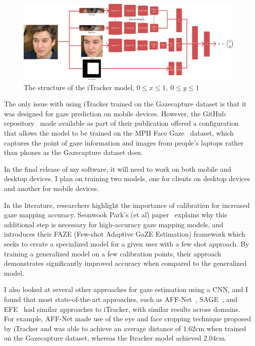 \documentclass{report}
\begin{document}
\begin{figure}[h]
    \begin{center}
        \includegraphics[scale=0.07]{../assets/itracker-model-my-own.png}
    \end{center}
    \caption{The structure of the iTracker model, \(0\leq x \leq 1,~0 \leq y \leq 1\)}
    \label{fig:itracker-model}
\end{figure}

The only issue with using iTracker trained on the Gazecapture dataset is that it was designed for gaze prediction on mobile devices. However, the GitHub repository~\cite{krafka2016eye,cheng2021survey} made available as part of their publication offered a configuration that allows the model to be trained on the MPII Face Gaze~\cite{zhang2019mpii} dataset, which captures the point of gaze information and images from people's laptops rather than phones as the Gazecapture dataset does.

In the final release of my software, it will need to work on both mobile and desktop devices. I plan on training two models, one for clients on desktop devices and another for mobile devices.

In the literature, researchers highlight the importance of calibration for increased gaze mapping accuracy. Seonwook Park's (et al\.) paper~\cite{seonwook2019fewshot} explains why this additional step is necessary for high-accuracy gaze mapping models, and introduces their FAZE (Few-shot Adaptive GaZE Estimation) framework which seeks to create a specialized model for a given user with a few shot approach. By training a generalized model on a few calibration points, their approach demonstrates significantly improved accuracy when compared to the generalized model. 

I also looked at several other approaches for gaze estimation using a CNN, and I found that most state-of-the-art approaches, such as AFF-Net~\cite{bao2021adaptive}, SAGE~\cite{junfeng2019on}, and EFE~\cite{balim2023efe} had similar approaches to iTracker, with similar results across domains. For example, AFF-Net made use of the eye and face cropping technique proposed by iTracker and was able to achieve an average distance of $1.62\text{cm}$ when trained on the Gazecapture dataset, whereas the Itracker model achieved $2.04\text{cm}$. 
\end{document}

